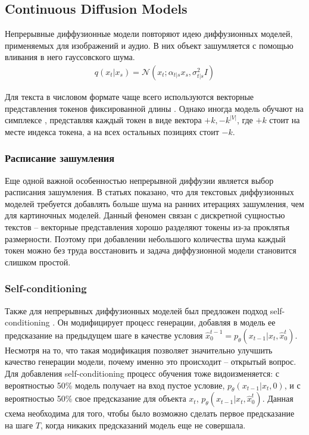 \documentclass[a4paper, 12pt]{article}
\begin{document}
\subsection{Continuous Diffusion Models}

Непрерывные диффузионные модели повторяют идею диффузионных моделей, применяемых для изображений и аудио. В них объект зашумляется с помощью вливания в него гауссовского шума.
\begin{align}
    q(x_t | x_s) = \mathcal{N}(x_t; \alpha_{t|s} x_{s}, \sigma_{t|s}^2 I)
\end{align}

Для текста в числовом формате чаще всего используются векторные представления токенов фиксированной длины \cite{diffusionlm, diffuseq, yuan2022seqdiffseq, lin2023genie, planner, dinoiser, difformer}. Однако иногда модель обучают на симплексе \cite{han2023ssdlmsemiautoregressivesimplexbaseddiffusion, mahabadi2024tesstexttotextselfconditionedsimplex}, представляя каждый токен в виде вектора ${+k, -k}^{|V|}$, где $+k$ стоит на месте индекса токена, а на всех остальных позициях стоит $-k$.

\subsubsection{Расписание зашумления}
Еще одной важной особенностью непрерывной диффузии является выбор расписания зашумления. В статьях \cite{diffusionlm, difformer, dinoiser} показано, что для текстовых диффузионных моделей требуется добавлять больше шума на ранних итерациях зашумления, чем для картиночных моделей. Данный феномен связан с дискретной сущностью текстов – векторные представления хорошо разделяют токены из-за проклятья размерности. Поэтому при добавлении небольшого количества шума каждый токен можно без труда восстановить и задача диффузионной модели становится слишком простой.

\subsubsection{Self-conditioning}
Также для непрерывных диффузионных моделей был предложен подход self-conditioning \cite{analogbits, sed}. Он модифицирует процесс генерации, добавляя в модель ее предсказание на предыдущем шаге в качестве условия $\hat{x}^{t-1}_0 = p_{\theta}(x_{t-1} | x_t, \hat{x}^t_0)$. Несмотря на то, что такая модификация позволяет значительно улучшить качество генерации модели, почему именно это происходит – открытый вопрос. Для добавления self-conditioning процесс обучения тоже видоизменяется: с вероятностью 50\% модель получает на вход пустое условие, $p_{\theta}(x_{t-1} | x_t, 0)$, и с вероятностью 50\% свое предсказание для объекта $x_t$, $p_{\theta}(x_{t-1} | x_t, \hat{x}^{t}_0)$. Данная схема необходима для того, чтобы было возможно сделать первое предсказание на шаге $T$, когда никаких предсказаний модель еще не совершала.
\end{document}
